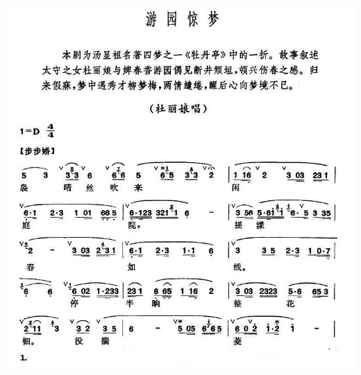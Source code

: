 \documentclass[cn,pad,chinesefont=nofont,twocol]{elegantbook}
\begin{document}
\paragraph*{\includegraphics[width=\textwidth]{mudanting/2020-牡丹亭-游园惊梦1}} 
\end{document}
